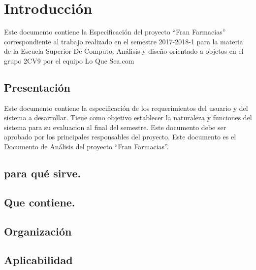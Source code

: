\chapter{Introducción}
Este documento contiene la Especificación del proyecto “Fran Farmacias” correspondiente al trabajo realizado en el
semestre 2017-2018-1 para la materia de la Escuela Superior De Computo. Análisis y diseño orientado a objetos en el
grupo 2CV9 por el equipo Lo Que Sea.com

\section{Presentación}

Este documento contiene la especificación de los requerimientos del usuario y del sistema a desarrollar.
Tiene como objetivo establecer la naturaleza y funciones del sistema para su evaluacion al final del semestre. 
Este documento debe ser aprobado por los principales responsables del proyecto.
Este documento es el Documento de Análisis del proyecto “Fran Farmacias”.

\section{para qué sirve.}
\section{Que contiene.}
\section{Organización}
\section{Aplicabilidad}

